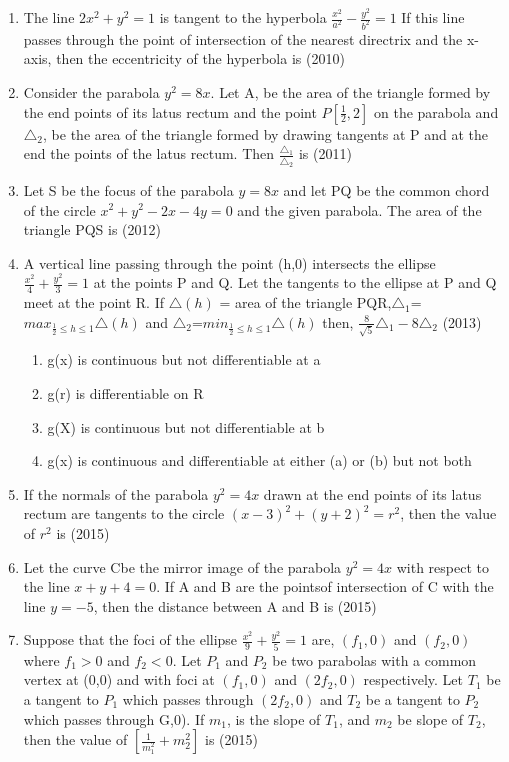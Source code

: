 \documentclass[12pt]{article}
\providecommand{\sbrak}[1]{\ensuremath{{}\left[#1\right]}}
\begin{document}
\begin{enumerate}
\item The line $2x^2+y^2=1$ is tangent to the hyperbola $\frac{x^2}{a^2}-\frac{y^2}{b^2}=1$ If this line passes through the point of intersection of the nearest directrix and the x-axis, then the eccentricity of the hyperbola is (2010)
\item Consider the parabola $y^2=8x$. Let A, be the area of the triangle formed by the end points of its latus rectum and the point $P\sbrak{\frac{1}{2},2}$ on the parabola and $\triangle_2$, be the area of the triangle formed by drawing tangents at P and at the end the points of the latus rectum. Then $\frac{\triangle_1}{\triangle_2}$ is (2011)
\item Let S be the focus of the parabola $y=8x$ and let PQ be the common chord of the circle $x^2+y^2-2x-4y=0$ and the given parabola. The area of the triangle PQS is (2012)
\item A vertical line passing through the point (h,0) intersects the ellipse $\frac{x^2}{4}+\frac{y^2}{3}=1$ at the points P and Q. Let the tangents to the ellipse at P and Q meet at the point R. If $\triangle(h)$ = area of the triangle PQR,$\triangle_1$=${max_{\frac{1}{2}\leq h \leq 1}}\triangle(h)$ and $\triangle_2$=${min_{\frac{1}{2}\leq h \leq 1}}\triangle(h)$ then, $\frac{8}{\sqrt{5}}\triangle_1-8\triangle_2$ (2013)
\begin{enumerate}
\item g(x) is continuous but not differentiable at a
\item g(r) is differentiable on R
\item g(X) is continuous but not differentiable at b
\item g(x) is continuous and differentiable at either (a) or (b) but not both
\end{enumerate}
\item If the normals of the parabola $y^2=4x$ drawn at the end points of its latus rectum are tangents to the circle $(x-3)^2+(y+2)^2=r^2$, then the value of $r^2$ is (2015)
\item Let the curve Cbe the mirror image of the parabola $y^2=4x$ with respect to the line $x+y+4=0$. If A and B are the pointsof intersection of C with the line $y=-5$, then the distance between A and B is (2015)
\item Suppose that the foci of the ellipse $\frac{x^2}{9}+\frac{y^2}{5}=1$ are, $(f_1,0)$ and $(f_2,0)$ where $f_1>0$ and $f_2<0$. Let $P_1$ and $P_2$ be two parabolas with a common vertex at (0,0) and with foci at $(f_1,0)$ and $(2f_2,0)$ respectively. Let $T_1$ be a tangent to $P_1$ which passes through $(2f_2,0)$ and $T_2$ be a tangent to $P_2$
which passes through G,0). If $m_1$, is the slope of $T_1$, and $m_2$ be slope of $T_2$, then the value of $\sbrak{\frac{1}{m_1^2}+m_2^2}$ is (2015)
\end{enumerate}
\end{document}

